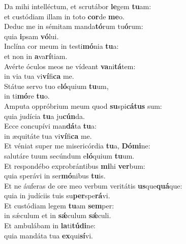 \evenverse Da mihi intelléctum, et scrutábor \textbf{le}gem \textbf{tu}am:~\*\\
\evenverse et custódiam illam in toto \textbf{cor}de \textbf{me}o.\\
\oddverse Deduc me in sémitam manda\textbf{tó}rum tu\textbf{ó}rum:~\*\\
\oddverse quia \textbf{i}psam \textbf{vó}lui.\\
\evenverse Inclína cor meum in testi\textbf{mó}nia \textbf{tu}a:~\*\\
\evenverse et non in \textbf{a}va\textbf{rí}tiam.\\
\oddverse Avérte óculos meos ne vídeant \textbf{va}ni\textbf{tá}tem:~\*\\
\oddverse in via tua vi\textbf{ví}fi\textbf{ca} me.\\
\evenverse Státue servo tuo e\textbf{ló}quium \textbf{tu}um,~\*\\
\evenverse in ti\textbf{mó}re \textbf{tu}o.\\
\oddverse Amputa oppróbrium meum quod \textbf{su}spi\textbf{cá}\textbf{tus} sum:~\*\\
\oddverse quia judícia \textbf{tu}a ju\textbf{cún}da.\\
\evenverse Ecce concupívi man\textbf{dá}ta \textbf{tu}a:~\*\\
\evenverse in æquitáte tua vi\textbf{ví}fi\textbf{ca} me.\\
\oddverse Et véniat super me misericórdia \textbf{tu}a, \textbf{Dó}\textbf{mi}ne:~\*\\
\oddverse salutáre tuum secúndum e\textbf{ló}quium \textbf{tu}um.\\
\evenverse Et respondébo exprobrántibus \textbf{mi}hi \textbf{ver}bum:~\*\\
\evenverse quia sperávi in ser\textbf{mó}nibus \textbf{tu}is.\\
\oddverse Et ne áuferas de ore meo verbum veritátis \textbf{us}que\textbf{quá}que:~\*\\
\oddverse quia in judíciis tuis su\textbf{per}spe\textbf{rá}vi.\\
\evenverse Et custódiam legem \textbf{tu}am \textbf{sem}per:~\*\\
\evenverse in sǽculum et in \textbf{sǽ}culum \textbf{sǽ}culi.\\
\oddverse Et ambulábam in \textbf{la}ti\textbf{tú}\textbf{di}ne:~\*\\
\oddverse quia mandáta tua \textbf{ex}qui\textbf{sí}vi.\\
